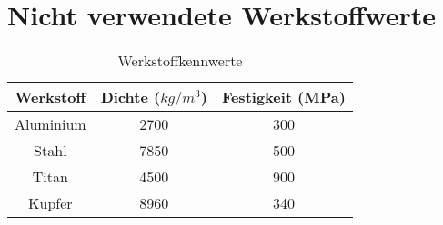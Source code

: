 \section*{Nicht verwendete Werkstoffwerte}

\begin{table}[h!]
\centering
\begin{tabular}{|c|c|c|}
\hline
Werkstoff & Dichte ($kg/m^3$) & Festigkeit (MPa) \\
\hline

Aluminium & 2700 & 300 \\
Stahl & 7850 & 500 \\
Titan & 4500 & 900 \\
Kupfer & 8960 & 340 \\
\hline
\end{tabular}
\caption{Werkstoffkennwerte}
\label{tab:werkstoffkennwerte}
\end{table}